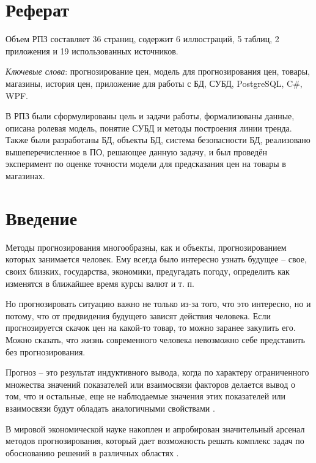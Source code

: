 \documentclass{bmstu}
\begin{document}
\setcounter{page}{3}	
\maketableofcontents

\chapter*{Реферат}

Объем РПЗ составляет 36 страниц, содержит 6 иллюстраций, 5 таблиц, 2 приложения и 19 использованных источников.

\textit{Ключевые слова}: прогнозирование цен, модель для прогнозирования цен, товары, магазины, история цен, приложение для работы с БД, СУБД, PostgreSQL, C\#, WPF.

В РПЗ были сформулированы цель и задачи работы, формализованы данные, описана ролевая модель, понятие СУБД и методы построения линии тренда. Также были разработаны БД, объекты БД, система безопасности БД, реализовано вышеперечисленное в ПО, решающее данную задачу, и был проведён эксперимент по оценке точности модели для предсказания цен на товары в магазинах.

\chapter*{Введение}

Методы прогнозирования многообразны, как и объекты, прогнозированием которых занимается человек. Ему всегда было интересно узнать будущее -- свое, своих близких, государства, экономики, предугадать погоду, определить как изменятся в ближайшее время курсы валют и т. п.

Но прогнозировать ситуацию важно не только из-за того, что это интересно, но и потому, что от предвидения будущего зависят действия человека. Если прогнозируется скачок цен на какой-то товар, то можно заранее закупить его. Можно сказать, что жизнь современного человека невозможно себе представить без прогнозирования.

Прогноз -- это результат индуктивного вывода, когда по характеру ограниченного множества значений показателей или взаимосвязи факторов делается вывод о том, что и остальные, еще не наблюдаемые значения этих показателей или взаимосвязи будут обладать аналогичными свойствами \cite{hse_pred}.

В мировой экономической науке накоплен и апробирован значительный арсенал методов прогнозирования, который дает возможность решать комплекс задач по обоснованию решений в различных областях \cite{bel_prog}.
\end{document}
